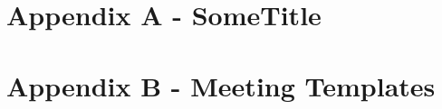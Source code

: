 \documentclass{article}
\begin{document}
\renewcommand{\thepage}{\roman{page}}




\newpage
\setcounter{page}{1}
\renewcommand{\thepage}{\arabic{page}}

\newpage


\newpage


\newpage


\newpage


\newpage


\newpage


\newpage



\appendix

\newpage
\section{Appendix A - SomeTitle}

\newpage


\newpage


\newpage
\section{Appendix B - Meeting Templates}

\newpage

\end{document}
